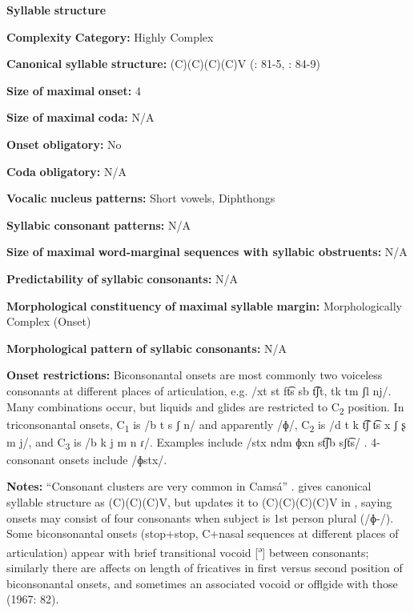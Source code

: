 \begin{styleBody}
\textbf{Syllable} \textbf{structure}

\textbf{Complexity} \textbf{Category:} Highly Complex

\textbf{Canonical} \textbf{syllable} \textbf{structure:} (C)(C)(C)(C)V (\citealt{Howard1967}: 81-5, \citealt{Howard1972}: 84-9)

\textbf{Size} \textbf{of} \textbf{maximal} \textbf{onset:} 4

\textbf{Size} \textbf{of} \textbf{maximal} \textbf{coda:} N/A

\textbf{Onset} \textbf{obligatory:} No

\textbf{Coda} \textbf{obligatory:} N/A

\textbf{Vocalic} \textbf{nucleus} \textbf{patterns:} Short vowels, Diphthongs

\textbf{Syllabic} \textbf{consonant} \textbf{patterns:} N/A

\textbf{Size} \textbf{of} \textbf{maximal} \textbf{word{}-marginal sequences with syllabic obstruents:} N/A

\textbf{Predictability} \textbf{of} \textbf{syllabic} \textbf{consonants:} N/A

\textbf{Morphological} \textbf{constituency} \textbf{of} \textbf{maximal} \textbf{syllable} \textbf{margin:} Morphologically Complex (Onset)

\textbf{Morphological} \textbf{pattern} \textbf{of} \textbf{syllabic} \textbf{consonants:} N/A

\textbf{Onset} \textbf{restrictions:} Biconsonantal onsets are most commonly two voiceless consonants at different places of articulation, e.g. /xt st ft͡s sb t͡ʃt, tk tm ʃl nj/. Many combinations occur, but liquids and glides are restricted to C\textsubscript{2} position. In triconsonantal onsets, C\textsubscript{1} is /b t s ʃ n/ and apparently /ɸ/, C\textsubscript{2} is /d t k t͡ʃ t͡s x ʃ ʂ m j/, and C\textsubscript{3} is /b k j m n ɾ/. Examples include /stx ndm ɸxn st͡ʃb sʃt͡s/ . 4-consonant onsets include /ɸstx/.

\textbf{Notes:} “Consonant clusters are very common in Camsá” \citep[81]{Howard1967}. \citet{Howard1967} gives canonical syllable structure as (C)(C)(C)V, but updates it to (C)(C)(C)(C)V in \citet{Howard1972}, saying onsets may consist of four consonants when subject is 1st person plural (/ɸ{}-/). Some biconsonantal onsets (stop+stop, C+nasal sequences at different places of articulation) appear with brief transitional vocoid [\textsuperscript{ə}] between consonants; similarly there are affects on length of fricatives in first versus second position of biconsonantal onsets, and sometimes an associated vocoid or offlgide with those (1967: 82).


\end{styleBody}

